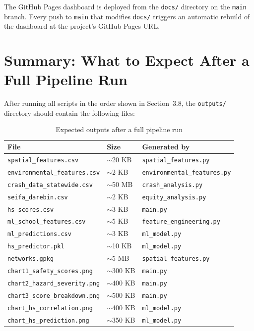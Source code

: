 \documentclass[11pt,a4paper,openany]{book}
\begin{document}
The GitHub Pages dashboard is deployed from the \texttt{docs/} directory on the \texttt{main} branch. Every push to \texttt{main} that modifies \texttt{docs/} triggers an automatic rebuild of the dashboard at the project's GitHub Pages URL.

\section{Summary: What to Expect After a Full Pipeline Run}

After running all scripts in the order shown in Section~3.8, the \texttt{outputs/} directory should contain the following files:

\begin{table}[H]
\centering
\caption{Expected outputs after a full pipeline run}
\begin{tabular}{L{5.5cm}L{2cm}L{5cm}}
\toprule
\textbf{File} & \textbf{Size} & \textbf{Generated by} \\
\midrule
\texttt{spatial\_features.csv} & $\sim$20 KB & \texttt{spatial\_features.py} \\
\texttt{environmental\_features.csv} & $\sim$2 KB & \texttt{environmental\_features.py} \\
\texttt{crash\_data\_statewide.csv} & $\sim$50 MB & \texttt{crash\_analysis.py} \\
\texttt{seifa\_darebin.csv} & $\sim$2 KB & \texttt{equity\_analysis.py} \\
\texttt{hs\_scores.csv} & $\sim$3 KB & \texttt{main.py} \\
\texttt{ml\_school\_features.csv} & $\sim$5 KB & \texttt{feature\_engineering.py} \\
\texttt{ml\_predictions.csv} & $\sim$3 KB & \texttt{ml\_model.py} \\
\texttt{hs\_predictor.pkl} & $\sim$10 KB & \texttt{ml\_model.py} \\
\texttt{networks.gpkg} & $\sim$5 MB & \texttt{spatial\_features.py} \\
\texttt{chart1\_safety\_scores.png} & $\sim$300 KB & \texttt{main.py} \\
\texttt{chart2\_hazard\_severity.png} & $\sim$400 KB & \texttt{main.py} \\
\texttt{chart3\_score\_breakdown.png} & $\sim$500 KB & \texttt{main.py} \\
\texttt{chart\_hs\_correlation.png} & $\sim$400 KB & \texttt{ml\_model.py} \\
\texttt{chart\_hs\_prediction.png} & $\sim$350 KB & \texttt{ml\_model.py} \\

\end{tabular}
\end{table}
\end{document}

